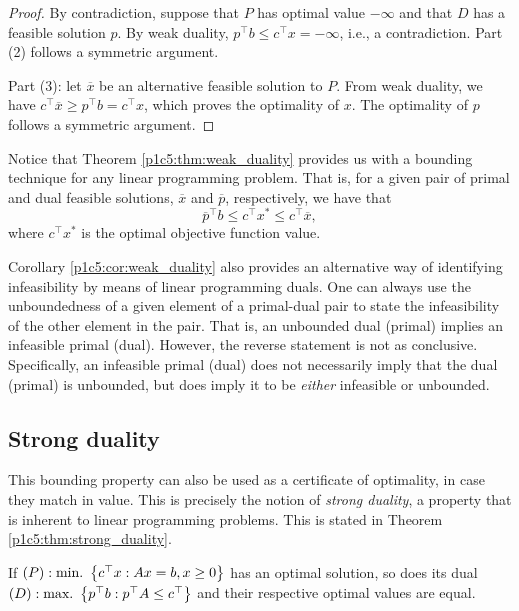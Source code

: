 \begin{proof} 
	By contradiction, suppose that $P$ has optimal value $-\infty$ and that $D$ has a feasible solution $p$. By weak duality, $p^\top b \leq c^\top x = -\infty$, i.e., a contradiction. Part (2) follows a symmetric argument.
	
	Part (3): let $\overline{x}$ be an alternative feasible solution to $P$. From weak duality, we have $c^\top \overline{x} \geq p^\top b = c^\top x$, which proves the optimality of $x$. The optimality of $p$ follows a symmetric argument.
\end{proof}

Notice that Theorem \ref{p1c5:thm:weak_duality} provides us with a bounding technique for any linear programming problem. That is, for a given pair of primal and dual feasible solutions, $\overline{x}$ and $\overline{p}$, respectively, we have that 
%
\begin{equation*}
	 \overline{p}^\top b \le c^\top x^* \le c^\top \overline{x},
\end{equation*}
%
where $c^\top x^*$ is the optimal objective function value.

Corollary \ref{p1c5:cor:weak_duality} also provides an alternative way of identifying infeasibility by means of linear programming duals. One can always use the unboundedness of a given element of a primal-dual pair to state the infeasibility of the other element in the pair. That is, an unbounded dual (primal) implies an infeasible primal (dual). However, the reverse statement is not as conclusive. Specifically, an infeasible primal (dual) does not necessarily imply that the dual (primal) is unbounded, but does imply it to be \emph{either} infeasible or unbounded.   


\subsection{Strong duality}

This bounding property can also be used as a certificate of optimality, in case they match in value. This is precisely the notion of \emph{strong duality}, a property that is inherent to linear programming problems. This is stated in Theorem \ref{p1c5:thm:strong_duality}.

\begin{theorem}\label{p1c5:thm:strong_duality}
	If $(P) : \mathop{\text{min.~}}\left\{ c^\top x : Ax = b, x \geq 0 \right \}$ has an optimal solution, so does its dual $(D) : \mathop{\text{max.~}}\left\{ p^\top b : p^\top A \leq c^\top \right \}$ and their respective optimal values are equal.
\end{theorem}

